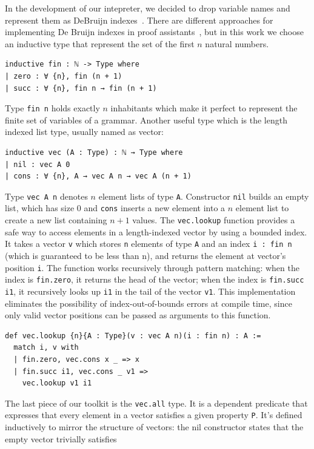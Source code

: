 \documentclass[preprint,12pt]{elsarticle}
\theoremstyle{definition}
\begin{document}
In the development of our intepreter, we decided to drop variable names and represent
them as DeBruijn indexes~\cite{DeBruijn72}. There are different approaches for implementing
De Bruijn indexes in proof assistants~\cite{Ni24}, but in this work we choose an
inductive type that represent the set of the first $n$ natural numbers.
\begin{lstlisting}
inductive fin : ℕ -> Type where
| zero : ∀ {n}, fin (n + 1)
| succ : ∀ {n}, fin n → fin (n + 1)
\end{lstlisting}
Type \lstinline|fin n| holds exactly $n$ inhabitants which make it perfect to represent
the finite set of variables of a grammar. Another useful type which is the length
indexed list type, usually named as vector:
\begin{lstlisting}
inductive vec (A : Type) : ℕ → Type where
| nil : vec A 0
| cons : ∀ {n}, A → vec A n → vec A (n + 1)
\end{lstlisting}
Type \lstinline|vec A n| denotes $n$ element lists of type \lstinline|A|. Constructor
\lstinline|nil| builds an empty list, which has size $0$ and \lstinline|cons| inserts
a new element into a $n$ element list to create a new list containing $n + 1$ values.
The \lstinline|vec.lookup| function provides a safe way to access elements in a
length-indexed vector by using a bounded index. It takes a vector \lstinline|v|
which stores \lstinline|n| elements of type \lstinline|A| and an index
\lstinline|i : fin n| (which is guaranteed to be less than n), and returns the
element at vector's position \lstinline|i|. The function works recursively
through pattern matching: when the index is \lstinline|fin.zero|, it returns the
head of the vector; when the index is \lstinline|fin.succ i1|, it recursively
looks up \lstinline|i1| in the tail of the vector \lstinline|v1|.
This implementation eliminates the possibility of index-out-of-bounds errors
at compile time, since only valid vector positions can be passed as arguments to
this function.
\begin{lstlisting}
def vec.lookup {n}{A : Type}(v : vec A n)(i : fin n) : A :=
  match i, v with
  | fin.zero, vec.cons x _ => x
  | fin.succ i1, vec.cons _ v1 =>
    vec.lookup v1 i1
\end{lstlisting}
The last piece of our toolkit is the \lstinline|vec.all| type. It is a dependent
predicate that expresses that every element in a vector satisfies a given
property \lstinline|P|. It's defined inductively to mirror the structure of
vectors: the nil constructor states that the empty vector trivially satisfies
\end{document}
